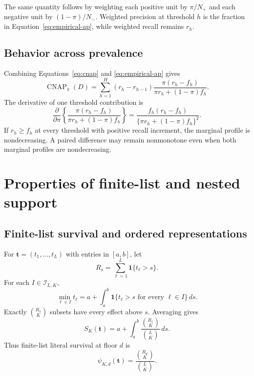 \documentclass[11pt]{article}
\newcommand{\CNAP}{\operatorname{CNAP}}
\theoremstyle{remark}
\begin{document}
The same quantity follows by weighting each positive unit by $\pi/N_+$ and
each negative unit by $(1-\pi)/N_-$. Weighted precision at threshold $h$ is
the fraction in Equation~\eqref{eq:empirical-ap}, while weighted recall remains
$r_h$.

\subsection{Behavior across prevalence}

Combining Equations~\eqref{eq:cnap} and \eqref{eq:empirical-ap} gives
\begin{equation}
\CNAP_\pi(D)
=
\sum_{h=1}^H
(r_h-r_{h-1})
\frac{\pi(r_h-f_h)}
{\pi r_h+(1-\pi)f_h}.
\label{eq:cnap-profile}
\end{equation}
The derivative of one threshold contribution is
\begin{equation}
\frac{\partial}{\partial\pi}
\left\{
\frac{\pi(r_h-f_h)}
{\pi r_h+(1-\pi)f_h}
\right\}
=
\frac{f_h(r_h-f_h)}
{\{\pi r_h+(1-\pi)f_h\}^2}.
\label{eq:cnap-derivative}
\end{equation}
If $r_h\geq f_h$ at every threshold with positive recall increment, the
marginal profile is nondecreasing. A paired difference may remain nonmonotone
even when both marginal profiles are nondecreasing.


\section{Properties of finite-list and nested support}
\label{app:support-proofs}

\subsection{Finite-list survival and ordered representations}

For $\mathbf t=(t_1,\ldots,t_L)$ with entries in $[a,b]$, let
\[
R_s=\sum_{\ell=1}^L\mathbf 1\{t_\ell>s\}.
\]
For each $I\in\mathcal I_{L,K}$,
\[
\min_{\ell\in I}t_\ell
=
a+\int_a^b
\mathbf 1\{t_\ell>s\text{ for every }\ell\in I\}\,ds.
\]
Exactly $\binom{R_s}{K}$ subsets have every effect above $s$. Averaging gives
\begin{equation}
S_K(\mathbf t)
=
a+\int_a^b
\frac{\binom{R_s}{K}}{\binom{L}{K}}\,ds.
\label{eq:finite-survival}
\end{equation}
Thus finite-list literal survival at floor $d$ is
\begin{equation}
\psi_{K,d}(\mathbf t)
=
\frac{\binom{R_d}{K}}{\binom{L}{K}}.
\label{eq:finite-literal}
\end{equation}
\end{document}
